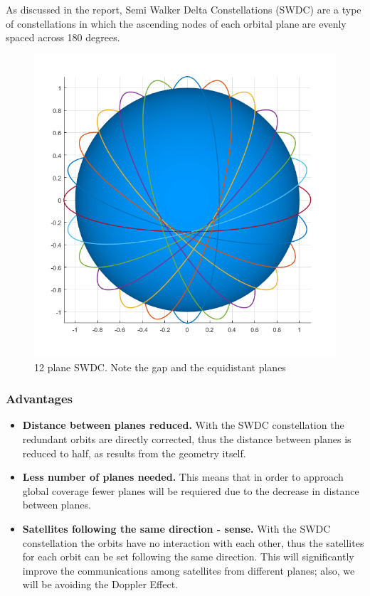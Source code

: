 \label{SemiWalkerDeltaConstellations}
As discussed in the report, Semi Walker Delta Constellations (SWDC) are a type of constellations in which the ascending nodes of each orbital plane are evenly spaced across 180 degrees.

\begin{figure}[H]
\includegraphics[width=12cm]{semiwalker12vertical}
\centering
\caption{12 plane SWDC. Note the gap and the equidistant planes}
\end{figure}

\subsubsection{Advantages}
\begin{itemize}[label={--}]
\item\textbf{Distance between planes reduced.} With the SWDC constellation the redundant orbits are directly corrected, thus the distance between planes is reduced to half, as results from the geometry itself.
\item\textbf{Less number of planes needed.} This means that in order to approach global coverage fewer planes will be requiered due to the decrease in distance between planes.
\item\textbf{Satellites following the same direction - sense.} With the SWDC constellation the orbits have no interaction with each other, thus the satellites for each orbit can be set following the same direction. This will significantly improve the communications among satellites from different planes; also, we will be avoiding the Doppler Effect.
\end{itemize}


